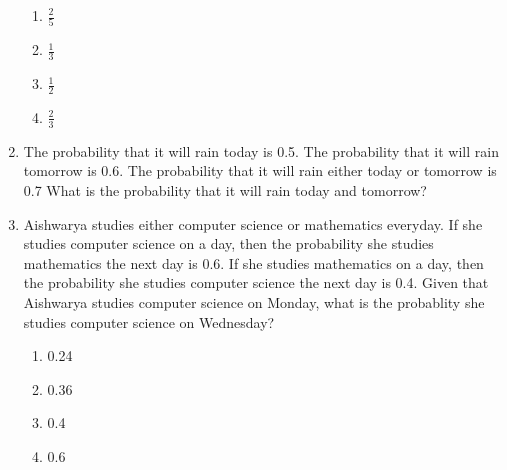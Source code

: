 \documentclass[journal,12pt,twocolumn]{IEEEtran}
\begin{document}
\begin{enumerate}
\begin{enumerate}
\item $ \frac{2}{5}$\\
\item $\frac{1}{3}$\\
\item $ \frac{1}{2}$\\
\item $\frac{2}{3}$

\end{enumerate}  
%
%
%
\item The probability that it will rain today is 0.5. The probability that it will rain tomorrow is 0.6. The probability that it will rain either today or tomorrow is 0.7 What is the probability that it will rain today and tomorrow?
%
\solution

\item Aishwarya studies either computer science or mathematics everyday. If she studies computer science on a day, then the probability she studies mathematics the next day is 0.6. If she studies mathematics on a day, then the probability she studies computer science the next day is 0.4.
Given that Aishwarya studies computer science on Monday, what is the probablity she studies computer science on Wednesday?
\begin{enumerate}[label=(\Alph*)]

\item 0.24
\item 0.36
\item 0.4
\item 0.6


\end{enumerate}
\end{enumerate}
\end{document}
